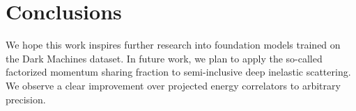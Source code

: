 \section{Conclusions}\label{sec:conclusions}

We hope this work inspires further research into foundation models
trained on the Dark Machines dataset. In future work, we plan to apply
the so-called factorized momentum sharing fraction to semi-inclusive
deep inelastic scattering. We observe a clear improvement over projected
energy correlators to arbitrary precision.

